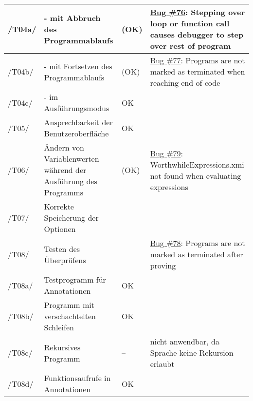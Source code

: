 \begin{landscape}
\begin{longtable}{lp{8cm}lp{10cm}}
/T04a/ &  - mit Abbruch des Programmablaufs & (OK) & \hyperlink{https://github.com/team-worthwhile/worthwhile/issues/76}{Bug \#76}: Stepping over loop or function call causes debugger to step over rest of program \\ \midrule
/T04b/ &  - mit Fortsetzen des Programmablaufs & (OK) & \hyperlink{https://github.com/team-worthwhile/worthwhile/issues/77}{Bug \#77}: Programs are not marked as terminated when reaching end of code \\ \midrule
/T04c/ &  - im Ausführungsmodus & OK &  \\ \midrule
\midrule
/T05/ & Ansprechbarkeit der Benutzeroberfläche & OK &  \\ \midrule
\midrule
/T06/ & Ändern von Variablenwerten während der Ausführung des Programms & (OK) & \hyperlink{https://github.com/team-worthwhile/worthwhile/issues/79}{Bug \#79}: WorthwhileExpressions.xmi not found when evaluating expressions \\ \midrule
\midrule
/T07/ & Korrekte Speicherung der Optionen &  &  \\ \midrule
\midrule
/T08/ & Testen des Überprüfens & & \hyperlink{https://github.com/team-worthwhile/worthwhile/issues/78}{Bug \#78}: Programs are not marked as terminated after proving \\ \midrule
/T08a/ & Testprogramm für Annotationen & OK &  \\ \midrule
/T08b/ & Programm mit verschachtelten Schleifen & OK &  \\ \midrule
/T08c/ & Rekursives Programm & -- & nicht anwendbar, da Sprache keine Rekursion erlaubt \\ \midrule
/T08d/ & Funktionsaufrufe in Annotationen & OK &  \\

\bottomrule
\bottomrule
\end{longtable}

\end{landscape}